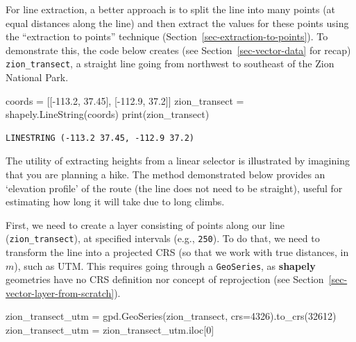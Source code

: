 \documentclass[
  letterpaper,
]{krantz}
\newenvironment{Shaded}{\begin{snugshade}}{\end{snugshade}}
\newcommand{\BuiltInTok}[1]{\textcolor[rgb]{0.00,0.23,0.31}{#1}}
\newcommand{\DecValTok}[1]{\textcolor[rgb]{0.68,0.00,0.00}{#1}}
\newcommand{\FloatTok}[1]{\textcolor[rgb]{0.68,0.00,0.00}{#1}}
\newcommand{\NormalTok}[1]{\textcolor[rgb]{0.00,0.23,0.31}{#1}}
\newcommand{\OperatorTok}[1]{\textcolor[rgb]{0.37,0.37,0.37}{#1}}
\begin{document}
For line extraction, a better approach is to split the line into many
points (at equal distances along the line) and then extract the values
for these points using the ``extraction to points'' technique
(Section~\ref{sec-extraction-to-points}). To demonstrate this, the code
below creates (see Section~\ref{sec-vector-data} for recap)
\texttt{zion\_transect}, a straight line going from northwest to
southeast of the Zion National Park.

\begin{Shaded}
\begin{Highlighting}[]
\NormalTok{coords }\OperatorTok{=}\NormalTok{ [[}\OperatorTok{{-}}\FloatTok{113.2}\NormalTok{, }\FloatTok{37.45}\NormalTok{], [}\OperatorTok{{-}}\FloatTok{112.9}\NormalTok{, }\FloatTok{37.2}\NormalTok{]]}
\NormalTok{zion\_transect }\OperatorTok{=}\NormalTok{ shapely.LineString(coords)}
\BuiltInTok{print}\NormalTok{(zion\_transect)}
\end{Highlighting}
\end{Shaded}

\begin{verbatim}
LINESTRING (-113.2 37.45, -112.9 37.2)
\end{verbatim}

The utility of extracting heights from a linear selector is illustrated
by imagining that you are planning a hike. The method demonstrated below
provides an `elevation profile' of the route (the line does not need to
be straight), useful for estimating how long it will take due to long
climbs.

First, we need to create a layer consisting of points along our line
(\texttt{zion\_transect}), at specified intervals (e.g., \texttt{250}).
To do that, we need to transform the line into a projected CRS (so that
we work with true distances, in \(m\)), such as UTM. This requires going
through a \texttt{GeoSeries}, as \textbf{shapely} geometries have no CRS
definition nor concept of reprojection (see
Section~\ref{sec-vector-layer-from-scratch}).

\begin{Shaded}
\begin{Highlighting}[]
\NormalTok{zion\_transect\_utm }\OperatorTok{=}\NormalTok{ gpd.GeoSeries(zion\_transect, crs}\OperatorTok{=}\DecValTok{4326}\NormalTok{).to\_crs(}\DecValTok{32612}\NormalTok{)}
\NormalTok{zion\_transect\_utm }\OperatorTok{=}\NormalTok{ zion\_transect\_utm.iloc[}\DecValTok{0}\NormalTok{]}
\end{Highlighting}
\end{Shaded}
\end{document}
